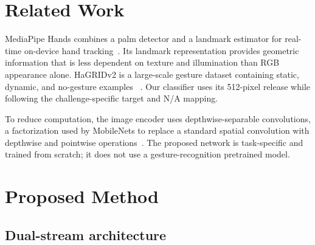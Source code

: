 \documentclass[10pt,twocolumn,a4paper]{article}
\begin{document}
\section{Related Work}
\label{sec:related-work}

MediaPipe Hands combines a palm detector and a landmark estimator for
real-time on-device hand tracking~\cite{zhang2020mediapipehands}. Its landmark
representation provides geometric information that is less dependent on
texture and illumination than RGB appearance alone. HaGRIDv2 is a large-scale
gesture dataset containing static, dynamic, and no-gesture examples
~\cite{nuzhdin2024hagridv2}. Our classifier uses its 512-pixel release while
following the challenge-specific target and N/A mapping.

To reduce computation, the image encoder uses depthwise-separable
convolutions, a factorization used by MobileNets to replace a standard spatial
convolution with depthwise and pointwise operations~\cite{howard2017mobilenets}.
The proposed network is task-specific and trained from scratch; it does not
use a gesture-recognition pretrained model.

\section{Proposed Method}
\label{sec:method}

\subsection{Dual-stream architecture}
\end{document}
